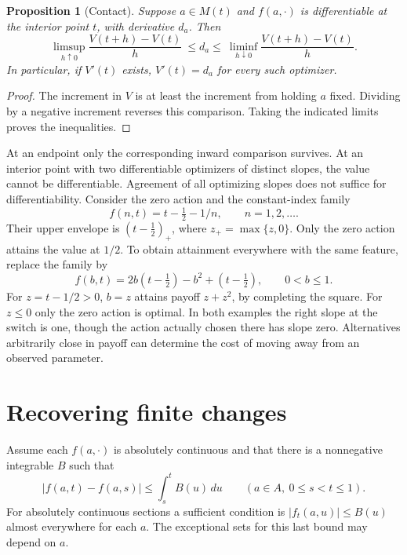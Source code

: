 \documentclass[11pt]{article}
\newtheorem{proposition}{Proposition}
\begin{document}
\begin{proposition}[Contact]
Suppose \(a\in M(t)\) and \(f(a,\cdot)\) is differentiable at the interior point \(t\), with derivative \(d_a\). Then
\[
 \limsup_{h\uparrow0}\frac{V(t+h)-V(t)}{h}
 \ \leq d_a\leq\
 \liminf_{h\downarrow0}\frac{V(t+h)-V(t)}{h}.
\]
In particular, if \(V'(t)\) exists, \(V'(t)=d_a\) for every such optimizer.
\end{proposition}
\begin{proof}
The increment in \(V\) is at least the increment from holding \(a\) fixed. Dividing by a negative increment reverses this comparison. Taking the indicated limits proves the inequalities.
\end{proof}

At an endpoint only the corresponding inward comparison survives. At an interior point with two differentiable optimizers of distinct slopes, the value cannot be differentiable. Agreement of all optimizing slopes does not suffice for differentiability. Consider the zero action and the constant-index family
\[
 f(n,t)=t-\tfrac12-1/n,\qquad n=1,2,\ldots .
\]
Their upper envelope is \((t-\tfrac12)_+\), where \(z_+=\max\{z,0\}\). Only the zero action attains the value at \(1/2\). To obtain attainment everywhere with the same feature, replace the family by
\[
 f(b,t)=2b(t-\tfrac12)-b^2+(t-\tfrac12),\qquad 0<b\leq1.
\]
For \(z=t-1/2>0\), \(b=z\) attains payoff \(z+z^2\), by completing the square. For \(z\leq0\) only the zero action is optimal. In both examples the right slope at the switch is one, though the action actually chosen there has slope zero. Alternatives arbitrarily close in payoff can determine the cost of moving away from an observed parameter.

\section{Recovering finite changes}

Assume each \(f(a,\cdot)\) is absolutely continuous and that there is a nonnegative integrable \(B\) such that
\begin{equation}
 |f(a,t)-f(a,s)|\leq\int_s^t B(u)\,du
 \qquad(a\in A,\ 0\leq s<t\leq1).                  \label{eq:bound}
\end{equation}
For absolutely continuous sections a sufficient condition is \(|f_t(a,u)|\leq B(u)\) almost everywhere for each \(a\). The exceptional sets for this last bound may depend on \(a\).
\end{document}
